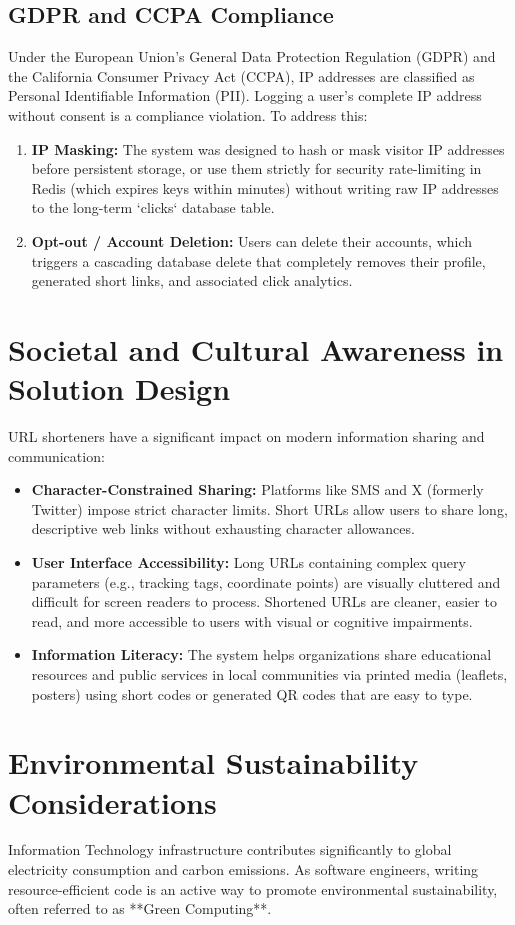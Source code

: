 \subsection{GDPR and CCPA Compliance}
Under the European Union's General Data Protection Regulation (GDPR) and the California Consumer Privacy Act (CCPA), IP addresses are classified as Personal Identifiable Information (PII). Logging a user's complete IP address without consent is a compliance violation.
To address this:
\begin{enumerate}
    \item \textbf{IP Masking:} The system was designed to hash or mask visitor IP addresses before persistent storage, or use them strictly for security rate-limiting in Redis (which expires keys within minutes) without writing raw IP addresses to the long-term `clicks` database table.
    \item \textbf{Opt-out / Account Deletion:} Users can delete their accounts, which triggers a cascading database delete that completely removes their profile, generated short links, and associated click analytics.
\end{enumerate}

\section{Societal and Cultural Awareness in Solution Design}
URL shorteners have a significant impact on modern information sharing and communication:
\begin{itemize}
    \item \textbf{Character-Constrained Sharing:} Platforms like SMS and X (formerly Twitter) impose strict character limits. Short URLs allow users to share long, descriptive web links without exhausting character allowances.
    \item \textbf{User Interface Accessibility:} Long URLs containing complex query parameters (e.g., tracking tags, coordinate points) are visually cluttered and difficult for screen readers to process. Shortened URLs are cleaner, easier to read, and more accessible to users with visual or cognitive impairments.
    \item \textbf{Information Literacy:} The system helps organizations share educational resources and public services in local communities via printed media (leaflets, posters) using short codes or generated QR codes that are easy to type.
\end{itemize}

\section{Environmental Sustainability Considerations}
Information Technology infrastructure contributes significantly to global electricity consumption and carbon emissions. As software engineers, writing resource-efficient code is an active way to promote environmental sustainability, often referred to as **Green Computing**.

